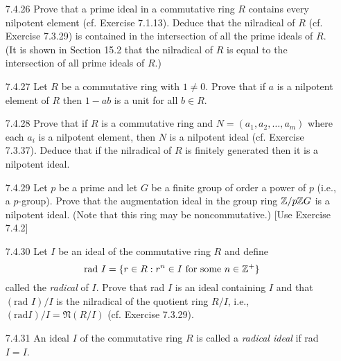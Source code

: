 \begin{enumerate}
   \item[7.4.26]  Prove that a prime ideal in a commutative ring $R$ contains
                  every nilpotent element (cf. Exercise 7.1.13). Deduce that the
                  nilradical of $R$ (cf. Exercise 7.3.29) is contained in the
                  intersection of all the prime ideals of $R$. (It is shown in
                  Section 15.2 that the nilradical of $R$ is equal to the
                  intersection of all prime ideals of $R$.)
   \item[7.4.27]  Let $R$ be a commutative ring with $1 \neq 0$. Prove that if
                  $a$ is a nilpotent element of $R$ then $1 - ab$ is a unit for
                  all $b \in R$.
   \item[7.4.28]  Prove that if $R$ is a commutative ring and
                  $N = (a_1, a_2, \ldots, a_m)$ where each $a_i$ is a nilpotent
                  element, then $N$ is a nilpotent ideal (cf. Exercise 7.3.37).
                  Deduce that if the nilradical of $R$ is finitely generated
                  then it is a nilpotent ideal.
   \item[7.4.29]  Let $p$ be a prime and let $G$ be a finite group of order a
                  power of $p$ (i.e., a $p$-group). Prove that the augmentation
                  ideal in the group ring $\mathbb{Z}/p\mathbb{Z} G$ is a nilpotent ideal. (Note
                  that this ring may be noncommutative.) [Use Exercise 7.4.2]
   \item[7.4.30]  Let $I$ be an ideal of the commutative ring $R$ and define
                  $$\text{rad }I = \{r \in R : r^n \in I
                    \text{ for some }n \in \mathbb{Z}^+\}$$
                  called the \textit{radical} of $I$. Prove that rad $I$ is an
                  ideal containing $I$ and that $(\text{rad }I)/I$ is the
                  nilradical of the quotient ring $R/I$, i.e.,
                  $(\text{rad} I)/I = \mathfrak{N}(R/I)$ (cf. Exercise 7.3.29).
   \item[7.4.31]  An ideal $I$ of the commutative ring $R$ is called a
                  \textit{radical ideal} if rad $I = I$.
                  \begin{enumerate}

\end{enumerate}
\end{enumerate}

